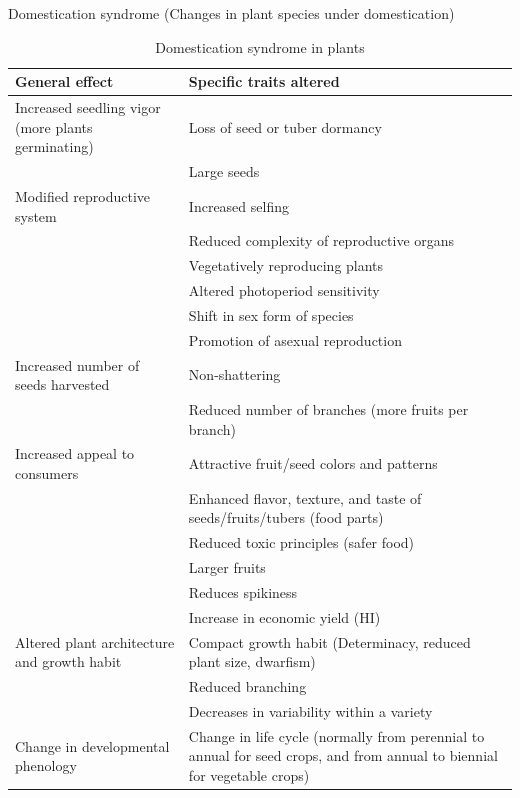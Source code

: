 \documentclass[11pt,ignorenonframetext,aspectratio=169]{beamer}
\begin{document}
\begin{frame}{Domestication syndrome (Changes in plant species under
domestication)}
\protect\hypertarget{domestication-syndrome-changes-in-plant-species-under-domestication}{}
\begin{table}

\caption{\label{tab:domestication-syndrome}Domestication syndrome in plants}
\centering
\fontsize{6}{8}\selectfont
\begin{tabular}[t]{>{\raggedright\arraybackslash}p{18em}>{\raggedright\arraybackslash}p{38em}}
\toprule
General effect & Specific traits altered\\
\midrule
\rowcolor{gray!6}  Increased seedling vigor (more plants germinating) & Loss of seed or tuber dormancy\\
 & Large seeds\\
\rowcolor{gray!6}  Modified reproductive system & Increased selfing\\
 & Reduced complexity of reproductive organs\\
\rowcolor{gray!6}   & Vegetatively reproducing plants\\
\addlinespace
 & Altered photoperiod sensitivity\\
\rowcolor{gray!6}   & Shift in sex form of species\\
 & Promotion of asexual reproduction\\
\rowcolor{gray!6}  Increased number of seeds harvested & Non-shattering\\
 & Reduced number of branches (more fruits per branch)\\
\addlinespace
\rowcolor{gray!6}  Increased appeal to consumers & Attractive fruit/seed colors and patterns\\
 & Enhanced flavor, texture, and taste of seeds/fruits/tubers (food parts)\\
\rowcolor{gray!6}   & Reduced toxic principles (safer food)\\
 & Larger fruits\\
\rowcolor{gray!6}   & Reduces spikiness\\
\addlinespace
 & Increase in economic yield (HI)\\
\rowcolor{gray!6}  Altered plant architecture and growth habit & Compact growth habit (Determinacy, reduced plant size, dwarfism)\\
 & Reduced branching\\
\rowcolor{gray!6}   & Decreases in variability within a variety\\
Change in developmental phenology & Change in life cycle (normally from perennial to annual for seed crops, and from annual to biennial for vegetable crops)\\
\bottomrule
\end{tabular}
\end{table}
\end{frame}
\end{document}
